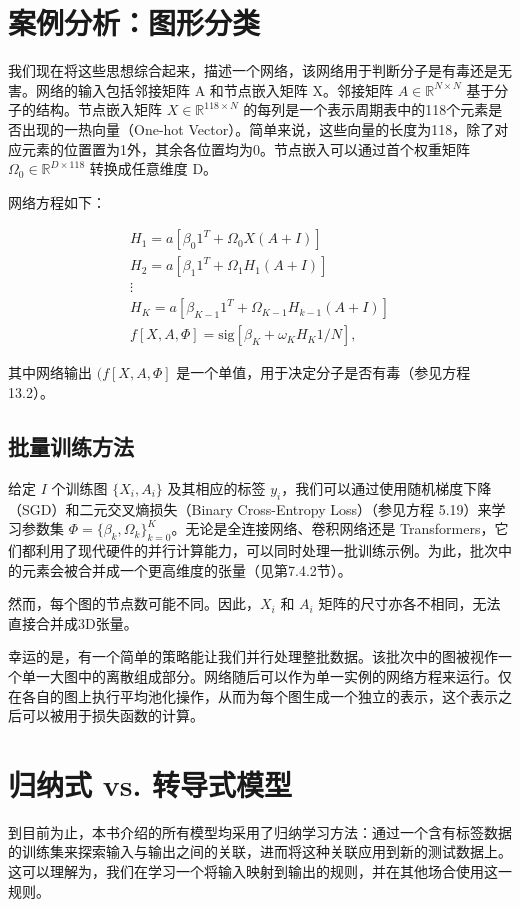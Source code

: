 \section{案例分析：图形分类}
我们现在将这些思想综合起来，描述一个网络，该网络用于判断分子是有毒还是无害。网络的输入包括邻接矩阵 A 和节点嵌入矩阵 X。邻接矩阵 \(A \in \mathbb{R}^{N \times N}\) 基于分子的结构。节点嵌入矩阵 \(X \in \mathbb{R}^{118 \times N}\) 的每列是一个表示周期表中的118个元素是否出现的一热向量（One-hot Vector）。简单来说，这些向量的长度为118，除了对应元素的位置置为1外，其余各位置均为0。节点嵌入可以通过首个权重矩阵  \(\Omega_0 \in \mathbb{R}^{D \times 118}\) 转换成任意维度 D。

网络方程如下：


\begin{align}
H_1 = a[\beta_0 1^T + \Omega_0 X(A + I)] \\
H_2 = a[\beta_1 1^T + \Omega_1 H_1(A + I)] \\
\vdots \\
H_K = a[\beta_{K-1} 1^T + \Omega_{K-1} H_{k-1}(A + I)] \\
f[X, A, \Phi] = \text{sig}[\beta_K + \omega_K H_K 1/N], 
\end{align} 


其中网络输出 \((f[X, A, \Phi]\) 是一个单值，用于决定分子是否有毒（参见方程 13.2）。
\subsection{批量训练方法}
给定 \(I\) 个训练图 \(\{X_i, A_i\}\) 及其相应的标签 \(y_i\)，我们可以通过使用随机梯度下降（SGD）和二元交叉熵损失（Binary Cross-Entropy Loss）（参见方程 5.19）来学习参数集 \(\Phi = \{\beta_k, \Omega_k\}^K_{k=0}\)。无论是全连接网络、卷积网络还是 Transformers，它们都利用了现代硬件的并行计算能力，可以同时处理一批训练示例。为此，批次中的元素会被合并成一个更高维度的张量（见第7.4.2节）。

然而，每个图的节点数可能不同。因此，\(X_i\) 和 \(A_i\) 矩阵的尺寸亦各不相同，无法直接合并成3D张量。

幸运的是，有一个简单的策略能让我们并行处理整批数据。该批次中的图被视作一个单一大图中的离散组成部分。网络随后可以作为单一实例的网络方程来运行。仅在各自的图上执行平均池化操作，从而为每个图生成一个独立的表示，这个表示之后可以被用于损失函数的计算。
\section{归纳式 vs. 转导式模型}
到目前为止，本书介绍的所有模型均采用了归纳学习方法：通过一个含有标签数据的训练集来探索输入与输出之间的关联，进而将这种关联应用到新的测试数据上。这可以理解为，我们在学习一个将输入映射到输出的规则，并在其他场合使用这一规则。

